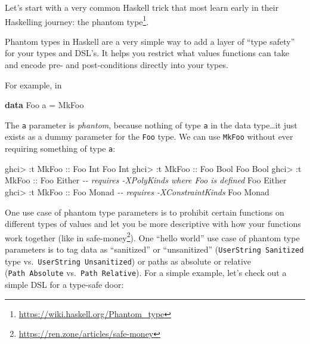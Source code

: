 \documentclass[]{article}
\newenvironment{Shaded}{}{}
\newcommand{\CommentTok}[1]{\textcolor[rgb]{0.38,0.63,0.69}{\textit{#1}}}
\newcommand{\DataTypeTok}[1]{\textcolor[rgb]{0.56,0.13,0.00}{#1}}
\newcommand{\KeywordTok}[1]{\textcolor[rgb]{0.00,0.44,0.13}{\textbf{#1}}}
\newcommand{\NormalTok}[1]{#1}
\newcommand{\OperatorTok}[1]{\textcolor[rgb]{0.40,0.40,0.40}{#1}}
\newcommand{\OtherTok}[1]{\textcolor[rgb]{0.00,0.44,0.13}{#1}}
\renewcommand{\href}[2]{#2\footnote{\url{#1}}}
\begin{document}
Let's start with a very common Haskell trick that most learn early in their
Haskelling journey: the \href{https://wiki.haskell.org/Phantom_type}{phantom
type}.

Phantom types in Haskell are a very simple way to add a layer of ``type safety''
for your types and DSL's. It helps you restrict what values functions can take
and encode pre- and post-conditions directly into your types.

For example, in

\begin{Shaded}
\begin{Highlighting}[]
\KeywordTok{data} \DataTypeTok{Foo}\NormalTok{ a }\OtherTok{=} \DataTypeTok{MkFoo}
\end{Highlighting}
\end{Shaded}

The \texttt{a} parameter is \emph{phantom}, because nothing of type \texttt{a}
in the data type\ldots it just exists as a dummy parameter for the \texttt{Foo}
type. We can use \texttt{MkFoo} without ever requiring something of type
\texttt{a}:

\begin{Shaded}
\begin{Highlighting}[]
\NormalTok{ghci}\OperatorTok{>} \OperatorTok{:}\NormalTok{t }\DataTypeTok{MkFoo}\OtherTok{ ::} \DataTypeTok{Foo} \DataTypeTok{Int}
\DataTypeTok{Foo} \DataTypeTok{Int}
\NormalTok{ghci}\OperatorTok{>} \OperatorTok{:}\NormalTok{t }\DataTypeTok{MkFoo}\OtherTok{ ::} \DataTypeTok{Foo} \DataTypeTok{Bool}
\DataTypeTok{Foo} \DataTypeTok{Bool}
\NormalTok{ghci}\OperatorTok{>} \OperatorTok{:}\NormalTok{t }\DataTypeTok{MkFoo}\OtherTok{ ::} \DataTypeTok{Foo} \DataTypeTok{Either}      \CommentTok{{-}{-} requires {-}XPolyKinds where \textquotesingle{}Foo\textquotesingle{} is defined}
\DataTypeTok{Foo} \DataTypeTok{Either}
\NormalTok{ghci}\OperatorTok{>} \OperatorTok{:}\NormalTok{t }\DataTypeTok{MkFoo}\OtherTok{ ::} \DataTypeTok{Foo} \DataTypeTok{Monad}       \CommentTok{{-}{-} requires {-}XConstraintKinds}
\DataTypeTok{Foo} \DataTypeTok{Monad}
\end{Highlighting}
\end{Shaded}

One use case of phantom type parameters is to prohibit certain functions on
different types of values and let you be more descriptive with how your
functions work together (like in
\href{https://ren.zone/articles/safe-money}{safe-money}). One ``hello world''
use case of phantom type parameters is to tag data as ``sanitized'' or
``unsanitized'' (\texttt{UserString\ \textquotesingle{}Sanitized} type
vs.~\texttt{UserString\ \textquotesingle{}Unsanitized}) or paths as absolute or
relative (\texttt{Path\ \textquotesingle{}Absolute}
vs.~\texttt{Path\ \textquotesingle{}Relative}). For a simple example, let's
check out a simple DSL for a type-safe door:
\end{document}
